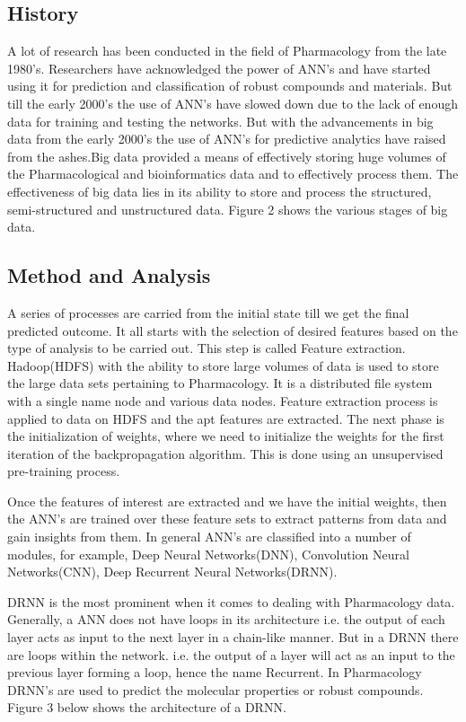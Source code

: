 \documentclass[sigconf]{acmart}
\begin{document}
\subsection{History}
A lot of research has been conducted in the field of Pharmacology from the late 1980's. Researchers have acknowledged the power of ANN's and have started using it for prediction and classification of robust compounds and materials.\cite{LucasAntonPastur-Romay2016} But till the early 2000's the use of ANN's have slowed down due to the lack of enough data for training and testing the networks. But with the advancements in big data from the early 2000's the use of ANN's for predictive analytics have raised from the ashes.Big data provided a means of effectively storing huge volumes of the Pharmacological and bioinformatics data and to effectively process them. The effectiveness of big data lies in its ability to store and process the structured, semi-structured and unstructured data. Figure 2 shows the various stages of big data.



\subsection{Method and Analysis}
A series of processes are carried from the initial state till we get the final predicted outcome. It all starts with the selection of desired features based on the type of analysis to be carried out. This step is called Feature extraction. Hadoop(HDFS) with the ability to store large volumes of data is used to store the large data sets pertaining to Pharmacology. It is a distributed file system with a single name node and various data nodes. Feature extraction process is applied to data on HDFS and the apt features are extracted. The next phase is the initialization of weights, where we need to initialize the weights for the first iteration of the backpropagation algorithm. This is done using an unsupervised pre-training process.

Once the features of interest are extracted and we have the initial weights, then the ANN's are trained over these feature sets to extract patterns from data and gain insights from them. In general ANN's are classified into a number of modules, for example, Deep Neural Networks(DNN), Convolution Neural Networks(CNN), Deep Recurrent Neural Networks(DRNN)\cite{LucasAntonPastur-Romay2016}. 


DRNN is the most prominent when it comes to dealing with Pharmacology data. Generally, a ANN does not have loops in its architecture i.e. the output of each layer acts as input to the next layer in a chain-like manner. But in a DRNN there are loops within the network. i.e. the output of a layer will act as an input to the previous layer forming a loop, hence the name Recurrent. In Pharmacology DRNN's are used to predict the molecular properties or robust compounds. Figure 3 below shows the architecture of a DRNN.
\end{document}
